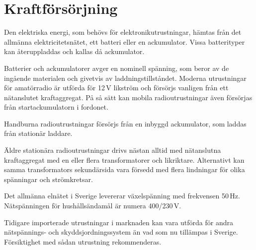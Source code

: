 \section{Kraftförsörjning}
\label{kraftaggregat}


Den elektriska energi, som behövs för elektronikutrustningar, hämtas
från det allmänna elektricitetsnätet, ett batteri eller en
ackumulator.
Vissa batterityper kan återuppladdas och kallas då ackumulator.

Batterier och ackumulatorer avger en nominell spänning, som beror av
de ingående materialen och givetvis av laddningstillståndet.
Moderna utrustningar för amatörradio är utförda för 12\,V likström och försörjs
vanligen från ett nätanslutet kraftaggregat.
På så sätt kan mobila radioutrustningar även försörjas från startackumulatorn
i fordonet.

Handburna radioutrustningar försörjs från en inbyggd ackumulator, som
laddas från stationär laddare.

Äldre stationära radioutrustningar drivs nästan alltid med nätanslutna
kraftaggregat med en eller flera transformatorer och likriktare.
Alternativt kan samma transformators sekundärsida vara
försedd med flera lindningar för olika spänningar och strömkretsar.

Det allmänna elnätet i Sverige levererar växelspänning med frekvensen 50\,Hz.
Nätspänningen för hushållsändamål är numera 400/230\,V.

Tidigare importerade utrustningar i marknaden kan vara utförda för andra
nätspännings- och skyddsjordningssystem än vad som nu tillämpas i Sverige.
Försiktighet med sådan utrustning rekommenderas.

